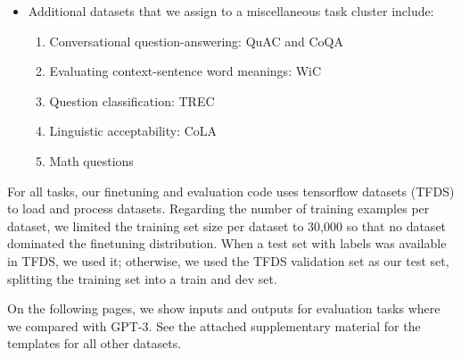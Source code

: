 \begin{itemize}[leftmargin=*]
\begin{enumerate}
        \item Gigaword \citep{napoles-etal-2012-annotated}
        \item MultiNews \citep{fabbri-etal-2019-multi}
        \item Newsroom \citep{grusky-etal-2018-newsroom}
        \item Samsum \citep{gliwa-etal-2019-samsum}
        \item XSum \citep{narayan-etal-2018-dont}
        \item AG News \citep{NIPS2015_250cf8b5}
        \item Opinion Abstracts - Rotten Tomatoes \citep{wang-ling-2016-neural}
        \item Opinion Abstracts - iDebate \citep{wang-ling-2016-neural}
        \item Wiki Lingua English \citep{ladhak-etal-2020-wikilingua}
    \end{enumerate}
    \item Additional datasets that we assign to a miscellaneous task cluster include:
    \begin{enumerate}
        \item Conversational question-answering: QuAC \citep{choi-etal-2018-quac} and CoQA  \citep{reddy-etal-2019-coqa}
        \item Evaluating context-sentence word meanings: WiC \citep{pilehvar-camacho-collados-2019-wic}
        \item Question classification: TREC \citep{li-roth-2002-learning,hovy-etal-2001-toward}
        \item Linguistic acceptability: CoLA \citep{warstadt2018neural}
        \item Math questions \citep{saxton2019analysing}
    \end{enumerate}
\end{itemize}

For all tasks, our finetuning and evaluation code uses tensorflow datasets (TFDS) to load and process datasets.
Regarding the number of training examples per dataset, we limited the training set size per dataset to 30,000 so that no dataset dominated the finetuning distribution.  
When a test set with labels was available in TFDS, we used it; otherwise, we used the TFDS validation set as our test set, splitting the training set into a train and dev set.

On the following pages, we show inputs and outputs for evaluation tasks where we compared with GPT-3. See the attached supplementary material for the templates for all other datasets.

